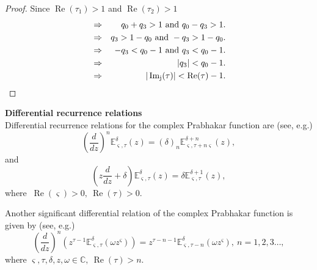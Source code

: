 \documentclass[a4paper,12pt]{article}
\theoremstyle{remark}
\begin{document}
\begin{proof}
\noindent 		Since
		$\operatorname{Re}(\tau_1)>1$ and  $\operatorname{Re}(\tau_2)  >1$
		\begin{eqnarray}\notag
		&\Rightarrow & q_0+q_3 >1 ~\text{and}~ q_0-q_3 >1.\\\notag
        &\Rightarrow & q_3 >1-q_0 ~\text{and}~ -q_3 >1-q_0.\\\notag
 &\Rightarrow & -q_3<q_0-1 ~\text{and}~ q_3 <q_0-1.\\\notag
		&	\Rightarrow& ~ |q_3|<q_0-1.\label{eq:re(alpha)g02}\\
		&\Rightarrow&|\operatorname{Im_j}(\tau)|<\operatorname{Re}(\tau)-1.
		\end{eqnarray}

\end{proof}




\noindent\textbf{Differential recurrence relations} \\
Differential recurrence relations for the complex Prabhakar function are  (see, e.g.\cite[p.91]{mathai2008})
\begin{equation}\label{eq:p11}
\left( \frac{d}{dz}\right)^n\mathbb{E}^{\delta}_{ \varsigma,\tau}(z)= (\delta)_n \mathbb{E}^{\delta+n}_{ \varsigma,\tau+n \varsigma}(z), 
\end{equation}
and
\begin{equation}\label{eq:p21}
\left( z\frac{d}{dz}+\delta\right)\mathbb{E}^{\delta}_{ \varsigma,\tau}(z)= \delta \mathbb{E}^{\delta+1}_{ \varsigma,\tau}(z),  \end{equation}
where $ ~\operatorname{Re}( \varsigma)>0,~\operatorname{Re}(\tau)>0.$


\noindent Another significant differential relation of the complex Prabhakar function is given by (see, e.g.\cite[p.99]{gorenflo2014})
\begin{equation}\label{eq: p31}
\left( \frac{d}{dz}\right)^n\left( z^{\tau-1}\mathbb{E}^\delta_{ \varsigma,\tau} (\omega z^ \varsigma) \right) =z^{\tau-n-1}\mathbb{E}^\delta_{ \varsigma,\tau-n}(\omega z^ \varsigma),~n=1,2,3 \dots,
\end{equation}
where $ \varsigma,\tau,\delta,z,\omega \in\mathbb{C},~\operatorname{Re}(\tau)>n.$ 

\end{document}
